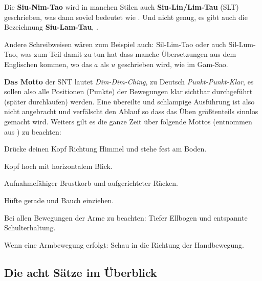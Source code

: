 \begin{WTCommonBegriff}
	Die \textbf{Siu-Nim-Tao} wird in manchen Stilen auch \textbf{Siu-Lin/Lim-Tau} (SLT) geschrieben, was dann soviel bedeutet wie . Und nicht genug, es gibt auch die Bezeichnung \textbf{Siu-Lam-Tau}, .
	
	Andere Schreibweisen w\"aren zum Beispiel auch: Sil-Lim-Tao oder auch Sil-Lum-Tao, was zum Teil damit zu tun hat dass manche \"Ubersetzungen aus dem Englischen kommen, wo das $a$ als $u$ geschrieben wird, wie im Gam-Sao.
\end{WTCommonBegriff}



\textbf{Das Motto} der SNT lautet \textit{Dim-Dim-Ching}, zu Deutsch \textit{Punkt-Punkt-Klar}, es sollen also alle Positionen (Punkte) der Bewegungen klar sichtbar durchgef\"uhrt (sp\"ater durchlaufen) werden. Eine \"ubereilte und schlampige Ausf\"uhrung ist also nicht angebracht und verf\"alscht den Ablauf so dass das \"Uben gr\"o{\ss}tenteils sinnlos gemacht wird. Weiters gilt es die ganze Zeit \"uber folgende Mottos (entnommen aus \cite{WTBIBLeu11}) zu beachten:

\begin{itemizeNarrow}
	\item Dr\"ucke deinen Kopf Richtung Himmel und stehe fest am Boden.
	\item Kopf hoch mit horizontalem Blick.
	\item Aufnahmef\"ahiger Brustkorb und aufgerichteter R\"ucken.
	\item H\"ufte gerade und Bauch einziehen.
	\item Bei allen Bewegungen der Arme zu beachten: Tiefer Ellbogen und entspannte Schulterhaltung.
	\item Wenn eine Armbewegung erfolgt: Schau in die Richtung der Handbewegung.
\end{itemizeNarrow}

\subsection*{Die acht S\"atze im \"Uberblick}


